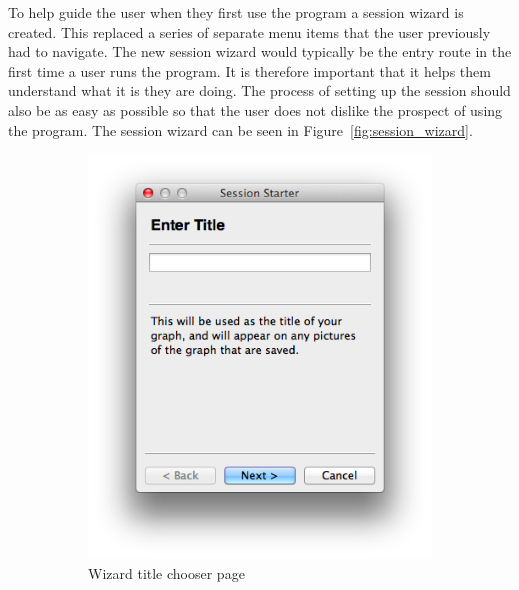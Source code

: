 To help guide the user when they first use the program a session wizard is created.  This replaced a series of separate menu items that the user previously had to navigate. The new session wizard would typically be the entry route in the first time a user runs the program.  It is therefore important that it helps them understand what it is they are doing.  The process of setting up the session should also be as easy as possible so that the user does not dislike the prospect of using the program.  The session wizard can be seen in Figure~\ref{fig:session_wizard}.

\begin{figure}[h!]
    \centering
    \begin{subfigure}[b]{0.4\textwidth}
        \centering
        \includegraphics[width=\textwidth]{images/wizard_page_1.png}
        \caption{Wizard title chooser page}
        \label{fig:page_1}
    \end{subfigure}
    \begin{subfigure}[b]{0.4\textwidth}
        \centering

\end{subfigure}
\end{figure}
